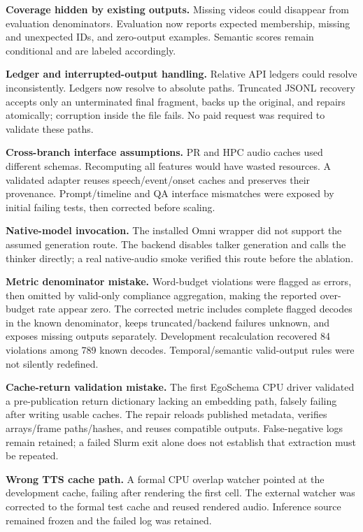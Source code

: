 \documentclass[10pt,twocolumn]{article}
\begin{document}
\textbf{Coverage hidden by existing outputs.} Missing videos could disappear from evaluation denominators. Evaluation now reports expected membership, missing and unexpected IDs, and zero-output examples. Semantic scores remain conditional and are labeled accordingly.

\textbf{Ledger and interrupted-output handling.} Relative API ledgers could resolve inconsistently. Ledgers now resolve to absolute paths. Truncated JSONL recovery accepts only an unterminated final fragment, backs up the original, and repairs atomically; corruption inside the file fails. No paid request was required to validate these paths.

\textbf{Cross-branch interface assumptions.} PR and HPC audio caches used different schemas. Recomputing all features would have wasted resources. A validated adapter reuses speech/event/onset caches and preserves their provenance. Prompt/timeline and QA interface mismatches were exposed by initial failing tests, then corrected before scaling.

\textbf{Native-model invocation.} The installed Omni wrapper did not support the assumed generation route. The backend disables talker generation and calls the thinker directly; a real native-audio smoke verified this route before the ablation.

\textbf{Metric denominator mistake.} Word-budget violations were flagged as errors, then omitted by valid-only compliance aggregation, making the reported over-budget rate appear zero. The corrected metric includes complete flagged decodes in the known denominator, keeps truncated/backend failures unknown, and exposes missing outputs separately. Development recalculation recovered 84 violations among 789 known decodes. Temporal/semantic valid-output rules were not silently redefined.

\textbf{Cache-return validation mistake.} The first EgoSchema CPU driver validated a pre-publication return dictionary lacking an embedding path, falsely failing after writing usable caches. The repair reloads published metadata, verifies arrays/frame paths/hashes, and reuses compatible outputs. False-negative logs remain retained; a failed Slurm exit alone does not establish that extraction must be repeated.

\textbf{Wrong TTS cache path.} A formal CPU overlap watcher pointed at the development cache, failing after rendering the first cell. The external watcher was corrected to the formal test cache and reused rendered audio. Inference source remained frozen and the failed log was retained.
\end{document}
